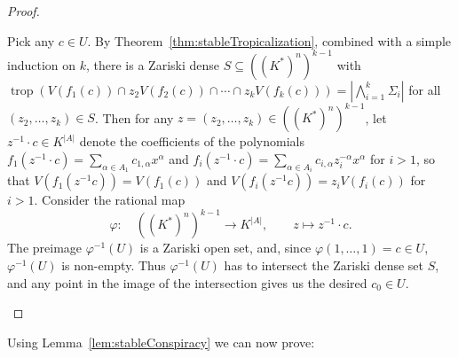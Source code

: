 \documentclass[11pt]{article}
\theoremstyle{definition}
\numberwithin{equation}{section}
\DeclareMathOperator{\trop}{trop}
\begin{document}
\begin{proof}
\begin{description}[leftmargin=0 pt]
  Pick any $c\in U$. By Theorem~\ref{thm:stableTropicalization}, combined with a simple induction on $k$, there is a Zariski dense $S\subseteq ((K^\ast)^n)^{k-1}$ with $\trop(V(f_1(c))\cap z_2V(f_2(c))\cap\cdots\cap z_kV(f_k(c)))=|\bigwedge_{i=1}^k\Sigma_i|$ for all ${(z_2,\dots,z_k)\in S}$. Then for any $z=(z_2,\dots,z_k)\in ((K^\ast)^n)^{k-1}$, let $z^{-1}\cdot c\in K^{|A|}$ denote the coefficients of the polynomials $f_1(z^{-1}\cdot c)=\sum_{\alpha\in A_1}c_{1,\alpha} x^\alpha$ and $f_i(z^{-1}\cdot c)=\sum_{\alpha\in A_i}c_{i,\alpha} z_i^{-\alpha}x^\alpha$ for $i>1$, so that $V(f_1(z^{-1}c))=V(f_1(c))$ and $V(f_i(z^{-1}c))=z_i V(f_i(c))$ for $i>1$. Consider the rational map
  \[ \varphi\colon\quad ((K^\ast)^n)^{k-1}\rightarrow K^{|A|}, \qquad z\mapsto z^{-1}\cdot c. \]
  The preimage $\varphi^{-1}(U)$ is a Zariski open set, and, since $\varphi(1,\dots,1)=c\in U$, $\varphi^{-1}(U)$ is non-empty. Thus $\varphi^{-1}(U)$ has to intersect the Zariski dense set $S$, and any point in the image of the intersection gives us the desired $c_0\in U$. \qedhere
  \end{description}
\end{proof}

Using Lemma~\ref{lem:stableConspiracy} we can now prove:
\end{document}
